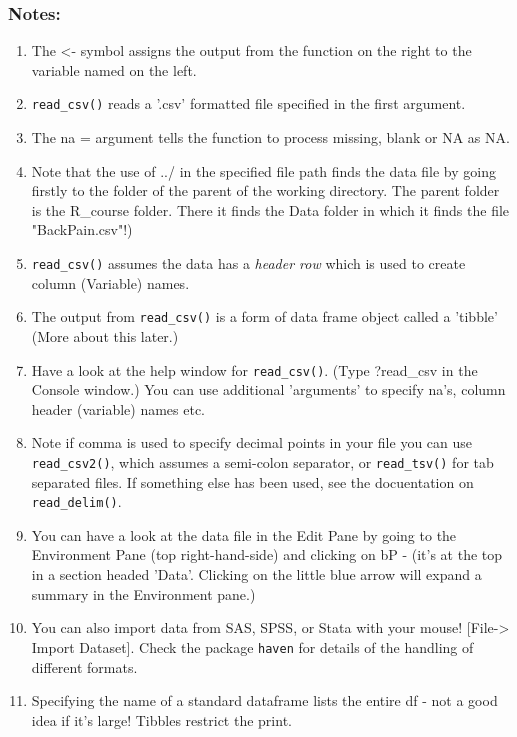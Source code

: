 \documentclass[titlepage]{book}\usepackage{knitr}
\begin{document}
  \subsubsection{Notes:}
\begin{enumerate}
\item{The <- symbol assigns the output from the function on the right to the variable named on the left.}
\item{\texttt{read\_csv()} reads a '.csv' formatted file specified in the first argument.}
\item{The na = argument tells the function to process missing, blank or NA as NA.}
\item{Note that the use of ../ in the specified file path finds the data file by going firstly to the folder of the parent of the working directory. The parent folder is the R\_course folder. There it finds the Data folder in which it finds the file "BackPain.csv"!)}
\item{\texttt{read\_csv()} assumes the data has a \textsl{header row} which is used to create column (Variable) names.}
\item{The output from \texttt{read\_csv()} is a form of data frame object called a 'tibble' (More about this later.)}
\item{Have a look at the help window for \texttt{read\_csv()}. (Type ?read\_csv in the Console window.) You can use  additional 'arguments' to specify na's, column header (variable) names etc.}
\item{Note if comma is used to specify decimal points in your file you can use {\texttt{read\_csv2()}}, which assumes a semi-colon separator, or {\texttt{read\_tsv()}} for tab separated files. If something else has been used, see the docuentation on {\texttt{read\_delim()}}.}
\item{You can have a look at the data file in the Edit Pane by going to the Environment Pane (top right-hand-side) and clicking on bP - (it's at the top in a section headed 'Data'. Clicking on the little blue arrow will expand a summary in the Environment pane.)}
\item{You can also import data from SAS, SPSS, or Stata  with your mouse! [File-> Import Dataset]. Check the package \texttt{haven} for details of the handling of different formats.}
\item{ Specifying the name of a standard dataframe lists the entire df - not a good idea if it's large! Tibbles restrict the print.}
\end{enumerate}
\end{document}
